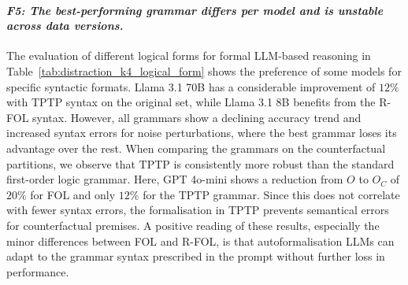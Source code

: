 \paragraph{\textbf{\emph{F5: The best-performing grammar differs per model and is unstable across data versions.}}}

The evaluation of different logical forms for formal \ac{LLM}-based reasoning in Table~\ref{tab:distraction_k4_logical_form} shows the preference of some models for specific syntactic formats.
Llama 3.1 70B has a considerable improvement of $12\%$ with TPTP syntax on the original set, while Llama 3.1 8B benefits from the R-FOL syntax. However, all grammars show a declining accuracy trend and increased syntax errors for noise perturbations, where the best grammar loses its advantage over the rest. 
When comparing the grammars on the counterfactual partitions, we observe that TPTP is consistently more robust than the standard first-order logic grammar. Here, GPT 4o-mini shows a reduction from $O$ to $O_C$ of $20\%$ for FOL and only $12\%$ for the TPTP grammar. Since this does not correlate with fewer syntax errors, the formalisation in TPTP prevents semantical errors for counterfactual premises. 
A positive reading of these results, especially the minor differences between FOL and R-FOL, is that autoformalisation \acp{LLM} can adapt to the grammar syntax prescribed in the prompt without further loss in performance.

